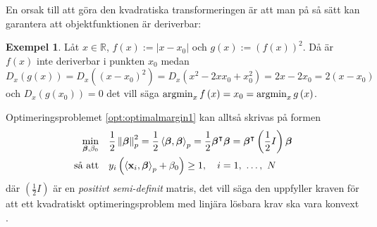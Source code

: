 \documentclass[a4paper, 12pt]{report}
\theoremstyle{definition}
\newtheorem{ex}{Exempel}[section]
\theoremstyle{remark}
\newcommand{\bfbeta}{{\boldsymbol{\beta}}}
\newcommand{\bfx}{\mathbf{x}}
\newcommand{\llangle}{\left\langle}
\newcommand{\rrangle}{\right\rangle}
\newcommand{\inner}[2]{\llangle #1, #2 \rrangle}
\begin{document}
En orsak till att göra den kvadratiska transformeringen är att man på så sätt kan garantera att objektfunktionen är deriverbar:
\begin{ex}
	Låt $x\in\mathbb{R}$, $f\left(x\right):=|x-x_0|$ och $g\left(x\right):=\left(f\left(x\right)\right)^2$. Då är $f\left(x\right)$ inte deriverbar i punkten $x_0$ medan $D_x\left(g\left(x\right)\right)=D_x\left(\left(x-x_0\right)^2\right)=D_x\left(x^2-2xx_0+x_0^2\right)=2x-2x_0=2\left(x-x_0\right)$ och $D_x\left(g\left(x_0\right)\right)=0$ det vill säga $\operatornamewithlimits{argmin}_x f\left(x\right) = x_0 = \operatornamewithlimits{argmin}_x g\left(x\right)$.
\end{ex}
Optimeringsproblemet \ref{opt:optimalmargin1} kan alltså skrivas på formen 
\begin{equation*}
\begin{aligned}
\operatornamewithlimits{min}_{\bfbeta, \beta_0} & & &\frac{1}{2}\left\|\bfbeta
\right\|_p^2=\frac{1}{2}\inner{\bfbeta}{\bfbeta}_p=\frac{1}{2}\bfbeta^\intercal\bfbeta=\bfbeta^\intercal\left(\frac{1}{2}I\right)\bfbeta\\
\text{så att} & & &y_i\left(\inner{\bfx_i}{\bfbeta}_p+\beta_0\right)\geq 1,\quad i=1,~\dots,~N
\end{aligned}
\end{equation*}
där $\left( \frac{1}{2}I \right)$ är en \emph{positivt semi-definit} matris, det vill säga den uppfyller kraven för att ett kvadratiskt optimeringsproblem med linjära lösbara krav ska vara konvext \cite{Boyd}.
\end{document}

